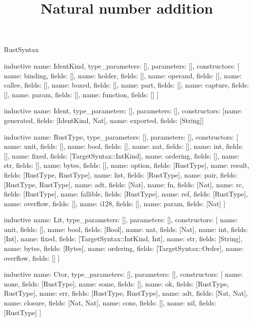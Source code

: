 \begin{lexlean}{RustSyntax}
\title{Natural number addition}
\begin{semanticmodule}
inductive{
  name: IdentKind,
  type_parameters: [],
  parameters: [],
  constructors: [
    {name: binding, fields: []},
    {name: holder, fields: []},
    {name: operand, fields: []},
    {name: callee, fields: []},
    {name: boxed, fields: []},
    {name: part, fields: []},
    {name: capture, fields: []},
    {name: param, fields: []},
    {name: function, fields: []}
  ]
}

inductive{
  name: Ident,
  type_parameters: [],
  parameters: [],
  constructors: [{name: generated, fields: [IdentKind, Nat]}, {name: exported, fields: [String]}]
}

inductive{
  name: RustType,
  type_parameters: [],
  parameters: [],
  constructors: [
    {name: unit, fields: []},
    {name: bool, fields: []},
    {name: nat, fields: []},
    {name: int, fields: []},
    {name: fixed, fields: [TargetSyntax::IntKind]},
    {name: ordering, fields: []},
    {name: str, fields: []},
    {name: bytes, fields: []},
    {name: option, fields: [RustType]},
    {name: result, fields: [RustType, RustType]},
    {name: list, fields: [RustType]},
    {name: pair, fields: [RustType, RustType]},
    {name: adt, fields: [Nat]},
    {name: fn, fields: [Nat]},
    {name: rc, fields: [RustType]},
    {name: fallible, fields: [RustType]},
    {name: ref, fields: [RustType]},
    {name: overflow, fields: []},
    {name: i128, fields: []},
    {name: param, fields: [Nat]}
  ]
}

inductive{
  name: Lit,
  type_parameters: [],
  parameters: [],
  constructors: [
    {name: unit, fields: []},
    {name: bool, fields: [Bool]},
    {name: nat, fields: [Nat]},
    {name: int, fields: [Int]},
    {name: fixed, fields: [TargetSyntax::IntKind, Int]},
    {name: str, fields: [String]},
    {name: bytes, fields: [Bytes]},
    {name: ordering, fields: [TargetSyntax::Order]},
    {name: overflow, fields: []}
  ]
}

inductive{
  name: Ctor,
  type_parameters: [],
  parameters: [],
  constructors: [
    {name: none, fields: [RustType]},
    {name: some, fields: []},
    {name: ok, fields: [RustType, RustType]},
    {name: err, fields: [RustType, RustType]},
    {name: adt, fields: [Nat, Nat]},
    {name: closure, fields: [Nat, Nat]},
    {name: cons, fields: []},
    {name: nil, fields: [RustType]}
  ]
}


\end{semanticmodule}
\end{lexlean}
